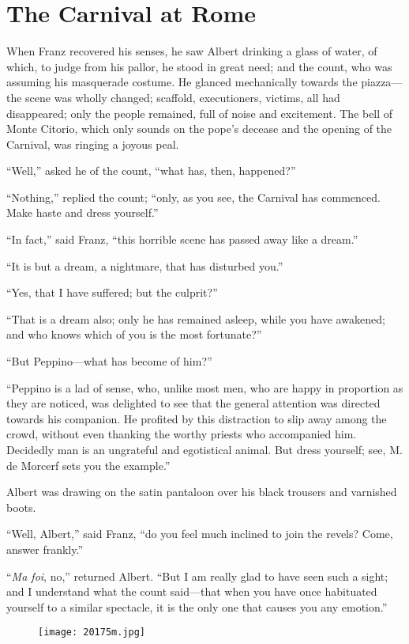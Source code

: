\chapter{The Carnival at Rome}

When Franz recovered his senses, he saw Albert drinking a glass of
water, of which, to judge from his pallor, he stood in great need; and
the count, who was assuming his masquerade costume. He glanced
mechanically towards the piazza—the scene was wholly changed; scaffold,
executioners, victims, all had disappeared; only the people remained,
full of noise and excitement. The bell of Monte Citorio, which only
sounds on the pope’s decease and the opening of the Carnival, was
ringing a joyous peal.

“Well,” asked he of the count, “what has, then, happened?”

“Nothing,” replied the count; “only, as you see, the Carnival has
commenced. Make haste and dress yourself.”

“In fact,” said Franz, “this horrible scene has passed away like a
dream.”

“It is but a dream, a nightmare, that has disturbed you.”

“Yes, that I have suffered; but the culprit?”

“That is a dream also; only he has remained asleep, while you have
awakened; and who knows which of you is the most fortunate?”

“But Peppino—what has become of him?”

“Peppino is a lad of sense, who, unlike most men, who are happy in
proportion as they are noticed, was delighted to see that the general
attention was directed towards his companion. He profited by this
distraction to slip away among the crowd, without even thanking the
worthy priests who accompanied him. Decidedly man is an ungrateful and
egotistical animal. But dress yourself; see, M. de Morcerf sets you the
example.”

Albert was drawing on the satin pantaloon over his black trousers and
varnished boots.

“Well, Albert,” said Franz, “do you feel much inclined to join the
revels? Come, answer frankly.”

“\textit{Ma foi}, no,” returned Albert. “But I am really glad to have seen
such a sight; and I understand what the count said—that when you have
once habituated yourself to a similar spectacle, it is the only one
that causes you any emotion.”

\begin{figure}[ht]
\texttt{[image: 20175m.jpg]}
\end{figure}

